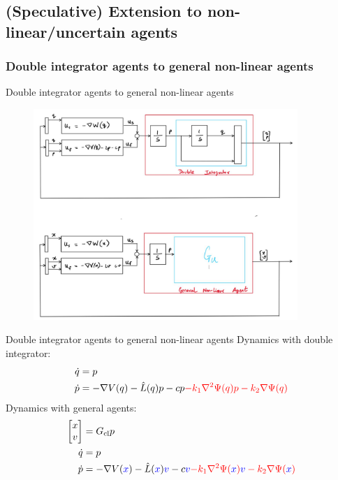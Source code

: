 \subsection{(Speculative) Extension to non-linear/uncertain agents} 
\subsubsection{Double integrator agents to general non-linear agents}
\begin{frame}{Double integrator agents to general non-linear agents}
	\begin{figure}[h!]
		\includegraphics[width=10cm]{doc/1_Flocking_source_seek/double_integrator_to_general_agents_slide.jpg}
		\label{fig:control_arch}	
	\end{figure}	
\end{frame}
\begin{frame}{Double integrator agents to general non-linear agents}
Dynamics with double integrator:
\begin{equation*}
\begin{split}
\Dot{q}&=p\\
\Dot{p}&=-\nabla V(q)-\hat{L}(q)p -cp\textcolor{red}{-k_1\nabla^2 \Psi(q) p -k_2 \nabla \Psi(q)}
\end{split}
\end{equation*}	
Dynamics with general agents:
\begin{equation*}
\begin{split}
\begin{bmatrix}
x\\v
\end{bmatrix}&=G_{\textnormal{cl}}p\\
\Dot{q}&=p\\
\Dot{p}&=-\nabla V(\textcolor{blue}{x})-\hat{L}(\textcolor{blue}{x})\textcolor{blue}{v} -c\textcolor{blue}{v}\textcolor{red}{-k_1\nabla^2 \Psi(\textcolor{blue}{x}) \textcolor{blue}{v} -k_2 \nabla \Psi(\textcolor{blue}{x})}
\end{split}
\end{equation*}			
\end{frame}

